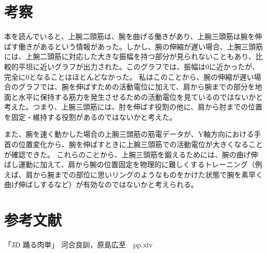 \documentclass{jsarticle}
\begin{document}
\section{考察}

本を読んでいると、上腕二頭筋は、腕を曲げる働きがあり、上腕三頭筋は腕を伸ばす働きがあるという情報があった\cite{reference}。しかし、腕の伸縮が遅い場合、上腕三頭筋には、上腕二頭筋に対応した大きな振幅を持つ部分が見られないこともあり、比較的平坦に近いグラフが出力された。このグラフでは、振幅は0に近かったが、完全に0となることはほとんどなかった。
私はこのことから、腕の伸縮が遅い場合のグラフでは、腕を伸ばすための活動電位に加えて、肩から腕までの部分を地面と水平に保持する筋力を発生させるための活動電位を見ているのではないかと考えた。つまり、上腕三頭筋には、肘を伸ばす役割の他に、肩から肘までの位置を固定・維持する役割があるのではないかと考えた。

また、腕を速く動かした場合の上腕三頭筋の筋電データが、Y軸方向における手首の位置変化から、腕を伸ばすときに上腕三頭筋での活動電位が大きくなることが確認できた。
これらのことから、上腕三頭筋を鍛えるためには、腕の曲げ伸ばし運動に加えて、肩から腕の位置固定を物理的に難しくするトレーニング（例えば、肩から腕までの部位に思いリングのようなものをかけた状態で腕を素早く曲げ伸ばしするなど）が有効なのではないかと考えられる。

\section{参考文献}
\begin{thebibliography}{9}
	 「3D 踊る肉単」 河合良訓，原島広至　pp.xiv
\end{thebibliography}
\end{document}
